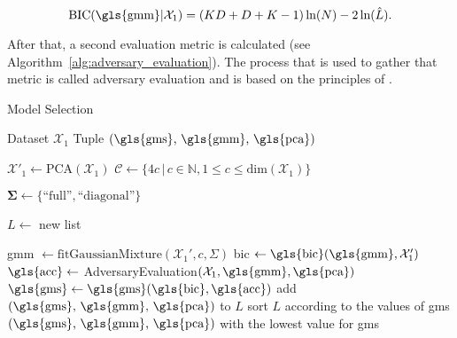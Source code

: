 \documentclass[../../main.tex]{subfiles}
\begin{document}
 \begin{equation}
     \text{BIC}(\text{\gls{gmm}}|\mathcal{X}_1) = (KD+D+K-1) \, \text{ln}(N) - 2 \, \text{ln}(\hat{L}).
 \end{equation}

 After that, a second evaluation metric is calculated (see Algorithm~\ref{alg:adversary_evaluation}). The process that is used to gather that metric is called adversary evaluation and is based on the principles of .
 


\begin{algorithm}
    \caption{Model Selection}
    \label{alg:model_selection}
 
    \begin{algorithmic}[1]
        \REQUIRE Dataset $\mathcal{X}_1$
        \ENSURE Tuple $(\text{\gls{gms}, \gls{gmm}, \gls{pca}})$

        \STATE $\mathcal{X}'_1 \leftarrow \text{PCA}(\mathcal{X}_1)$
        \STATE $\mathcal{C} \leftarrow \{ 4c \, | \,  c\in \mathbb{N}, 1 \leq c \leq \text{dim}(\mathcal{X}_1) \}$
        
        \STATE $\bm{\Sigma} \leftarrow \{\text{``full''}, \text{``diagonal''}\}$

        \STATE $L \leftarrow$ new list

                \STATE \gls{gmm} $\leftarrow \text{fitGaussianMixture}(\mathcal{X}_1', c, \Sigma)$
                \STATE \gls{bic} $\leftarrow \text{\gls{bic}}(\text{\gls{gmm}}, \mathcal{X}_1')$
                \STATE $\text{\gls{acc}} \leftarrow$ AdversaryEvaluation$(\mathcal{X}_1, \text{\gls{gmm}}, \text{\gls{pca}})$
                \STATE $\text{\gls{gms}} \leftarrow \text{\gls{gms}}(\text{\gls{bic}}, \text{\gls{acc}})$
                \STATE add $(\text{\gls{gms}, \gls{gmm}, \gls{pca}})$ to $L$
            \ENDFOR
        \ENDFOR
        \STATE sort $L$ according to the values of \gls{gms} 
        \RETURN $(\text{\gls{gms}, \gls{gmm}, \gls{pca}})$ with the lowest value for \gls{gms}
    \end{algorithmic}
 \end{algorithm}
\end{document}
